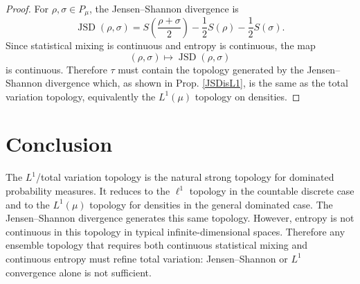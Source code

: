 \documentclass{techbrief}
\begin{document}
\begin{proof}
	For $\rho,\sigma\in P_\mu$, the Jensen--Shannon divergence is
	\begin{equation}
		\operatorname{JSD}(\rho,\sigma)
		=
		S\left(\frac{\rho+\sigma}{2}\right)
		-
		\frac{1}{2}S(\rho)
		-
		\frac{1}{2}S(\sigma).
	\end{equation}
	Since statistical mixing is continuous and entropy is continuous, the map
	\begin{equation}
		(\rho,\sigma)
		\mapsto
		\operatorname{JSD}(\rho,\sigma)
	\end{equation}
	is continuous. Therefore $\tau$ must contain the topology generated by the Jensen--Shannon divergence which, as shown in Prop. \ref{JSDisL1}, is the same as the total variation topology, equivalently the $L^1(\mu)$ topology on densities.
\end{proof}
	
	\section{Conclusion}
	
	The $L^1$/total variation topology is the natural strong topology for dominated probability measures. It reduces to the $\ell^1$ topology in the countable discrete case and to the $L^1(\mu)$ topology for densities in the general dominated case. The Jensen--Shannon divergence generates this same topology. However, entropy is not continuous in this topology in typical infinite-dimensional spaces. Therefore any ensemble topology that requires both continuous statistical mixing and continuous entropy must refine total variation: Jensen--Shannon or $L^1$ convergence alone is not sufficient.
	
\end{document}
